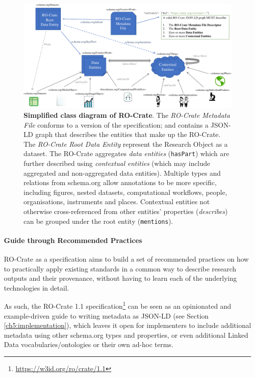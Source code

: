 \begin{figure}
\includegraphics[width=\textwidth]{figures/ch05/ro-crate-uml.pdf}
	\caption[Simplified class diagram of RO-Crate]{\textbf{Simplified class diagram of RO-Crate}. The 
\emph{RO-Crate Metadata File} conforms to a version of the specification;
and contains a JSON-LD graph \cite{Sporny 2014} that describes the
entities that make up the RO-Crate. The \emph{RO-Crate Root Data
Entity} represent the Research Object as a dataset. The RO-Crate
aggregates \emph{data entities} (\texttt{hasPart}) which are further
described using \emph{contextual entities} (which may include
aggregated and non-aggregated data entities). Multiple types and
relations from schema.org allow annotations to be more specific,
including figures, nested datasets, computational workflows, people,
organisations, instruments and places. Contextual entities not
otherwise cross-referenced from other entities' properties 
(\emph{describes}) can be grouped under the root entity (\texttt{mentions}).}
\label{ch5:fig:uml}
\end{figure}

\paragraph{Guide through Recommended
Practices}\label{ch5:recommendedpractices}

RO-Crate as a specification aims to build a set of recommended practices
on how to practically apply existing standards in a common way to
describe research outputs and their provenance, without having to learn
each of the underlying technologies in detail.

As such, the RO-Crate 1.1
specification\footnote{\url{https://w3id.org/ro/crate/1.1}} \cite{RO-Crate 1.1.3}
can be seen as an opinionated and example-driven guide to writing
\cite{Guha 2015} metadata as
JSON-LD \cite{Sporny 2014} (see
Section \vref{ch5:implementation}), which
leaves it open for implementers to include additional metadata using
other schema.org types and properties, or even additional Linked Data
vocabularies/ontologies or their own ad-hoc terms.

